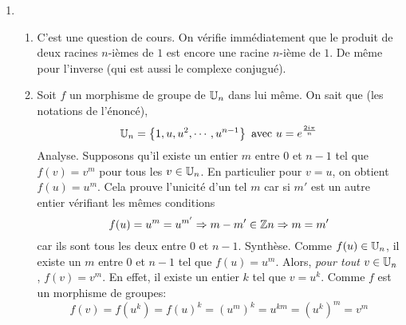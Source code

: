 \begin{enumerate}
 \item 
\begin{enumerate}
 \item C'est une question de cours. On vérifie immédiatement que le produit de deux racines $n$-ièmes de $1$ est encore une racine $n$-ième de $1$. De même pour l'inverse (qui est aussi le complexe conjugué).
\item Soit $f$ un morphisme de groupe de $\mathbb{U}_n$ dans lui même. On sait que (les notations de l'énoncé),
\begin{displaymath}
 \mathbb{U}_n=\left\lbrace 1,u,u^2,\cdots,u^{n-1}\right\rbrace\text{ avec } u=e^{\frac{2i\pi}{n}}
\end{displaymath}
Analyse. Supposons qu'il existe un entier $m$ entre $0$ et $n-1$ tel que $f(v)=v^m$ pour tous les $v\in \mathbb{U}_n$. En particulier pour $v=u$, on obtient $f(u)=u^m$. Cela prouve l'unicité d'un tel $m$ car si $m'$ est un autre entier vérifiant les mêmes conditions
\begin{displaymath}
 f(u)=u^m=u^{m'}\Rightarrow m-m'\in \mathbb{Z} n\Rightarrow m=m'
\end{displaymath}
car ils sont tous les deux entre $0$ et $n-1$.\newline
Synthèse. Comme $f(u)\in\mathbb{U}_n$, il existe un $m$ entre $0$ et $n-1$ tel que $f(u)=u^m$. Alors, \emph{pour tout} $v\in\mathbb{U}_n$, $f(v)=v^m$. En effet, il existe un entier $k$ tel que $v=u^k$. Comme $f$ est un morphisme de groupes:
\begin{displaymath}
 f(v)=f(u^k)=f(u)^k=\left( u^m\right)^k=u^{km}= \left( u^k\right)^m = v^m
\end{displaymath}

\end{enumerate}


\end{enumerate}
